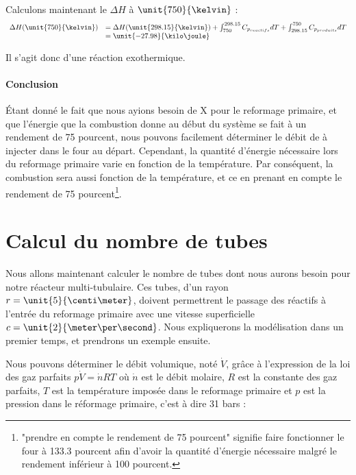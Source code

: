 Calculons maintenant le $\Delta H$ à $\unit{750}{\kelvin}$ :			
$$
	\begin{array}{rl}
		 	 \Delta H(\unit{750}{\kelvin})	&=  \Delta H(\unit{298.15}{\kelvin}) 
																							+ \int_{750}^{298.15} C_{p_{reactifs}} dT + \int_{298.15}^{750} C_{p_{produits}} dT \\
																				&=  \unit{-27.98}{\kilo\joule}
	\end{array}
$$	
	
Il s'agit donc d'une réaction exothermique.

\paragraph{Conclusion}
\'Etant donné le fait que nous ayions besoin de \unit{X}{\kilo\joule} pour le reformage primaire, et que l'énergie
que la combustion donne au début du système se fait à un rendement de 75 pourcent, nous pouvons facilement déterminer
le débit de  à injecter dans le four au départ. Cependant, la quantité d'énergie nécessaire lors du
reformage primaire varie en fonction de la température. Par conséquent, la combustion sera aussi fonction de la température,
et ce en prenant en compte le rendement de 75 pourcent\footnote{"prendre en compte le rendement de 75 pourcent" signifie faire
fonctionner le four à 133.3 pourcent afin d'avoir la quantité d'énergie nécessaire malgré le rendement inférieur 
à 100 pourcent.}.


\section{Calcul du nombre de tubes}
Nous allons maintenant calculer le nombre de tubes dont nous aurons besoin
pour notre réacteur multi-tubulaire. Ces tubes, d'un rayon $r = \unit{5}{\centi\meter}$,
doivent permettrent le passage des réactifs à l'entrée du reformage primaire avec une
vitesse superficielle $c = \unit{2}{\meter\per\second}$. 
Nous expliquerons la modélisation dans un premier temps, et prendrons un exemple ensuite.

Nous pouvons déterminer le débit volumique, noté $\dot{V}$, grâce à l'expression de la loi des gaz
parfaits $p\dot{V} = \dot{n}RT$ où $\dot{n}$ est le débit molaire, $R$ est la constante des gaz parfaits,
$T$ est la température imposée dans le reformage primaire et $p$ est la
pression dans le réformage primaire, c'est à dire 31 bars :

